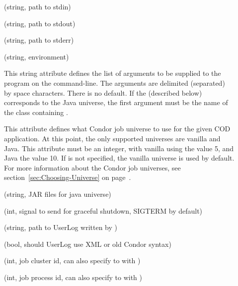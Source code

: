 \begin{description}

 \item[] (string, path to stdin)

 \item[] (string, path to stdout)

 \item[] (string, path to stderr)

 \item[] (string, environment)

 \item[] This string attribute defines the list of
   arguments to be supplied to the program on the command-line.
   The arguments are delimited (separated) by space characters. 
   There is no default. 
   If the  (described below) corresponds to the Java
   universe, the first argument must be the name of the class
   containing .

 \item[] This attribute defines what Condor job
   universe to use for the given COD application.
   At this point, the only supported universes are vanilla and Java.
   This attribute must be an integer, with vanilla using the value 5,
   and Java the value 10.
   If  is not specified, the vanilla universe is
   used by default.
   For more information about the Condor job universes, see
   section~\ref{sec:Choosing-Universe} on
   page~\pageref{sec:Choosing-Universe}. 

 \item[] (string, JAR files for java universe)

 \item[] (int, signal to send for graceful shutdown,
 SIGTERM by default)

 \item[] (string, path to UserLog written by
 ) 

 \item[] (bool, should UserLog use XML or
 old Condor syntax)

 \item[] (int, job cluster id, can also specify to
  with )

 \item[] (int, job process id, can also specify to
  with )

\end{description}

